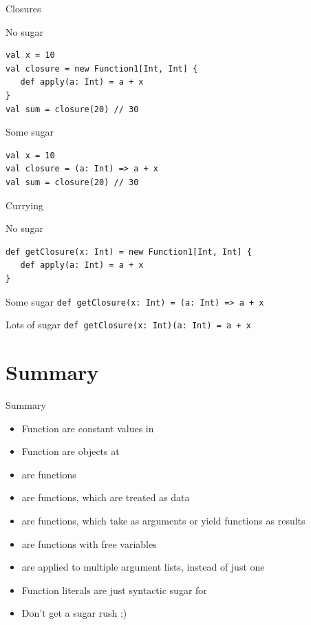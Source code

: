 \begin{frame}[fragile]{Closures}
\begin{exampleblock}{No sugar}
\begin{lstlisting}
val x = 10
val closure = new Function1[Int, Int] {
   def apply(a: Int) = a + x
}
val sum = closure(20) // 30
\end{lstlisting}
\end{exampleblock}
\begin{exampleblock}{Some sugar}
\begin{lstlisting}
val x = 10
val closure = (a: Int) => a + x
val sum = closure(20) // 30
\end{lstlisting}
\end{exampleblock}
\end{frame}

\begin{frame}[fragile]{Currying}
\begin{exampleblock}{No sugar}
\begin{lstlisting}
def getClosure(x: Int) = new Function1[Int, Int] {
   def apply(a: Int) = a + x
}
\end{lstlisting}
\end{exampleblock}
\begin{exampleblock}{Some sugar}
\lstinline!def getClosure(x: Int) = (a: Int) => a + x!
\end{exampleblock}
\begin{exampleblock}{Lots of sugar}
\lstinline!def getClosure(x: Int)(a: Int) = a + x!
\end{exampleblock}
\end{frame}

\section{Summary}
\begin{frame}{Summary}
\begin{itemize}
  \item Function  are constant values in 
  \item Function  are objects at 
  \item {} are  functions
  \item {} are functions, which are treated as
  data
  \item {} are functions, which take
   as arguments or yield functions as results
  \item {} are functions with free variables
  \item {} are applied to multiple argument lists,
  instead of just one
  \item Function literals are just syntactic sugar for 
  \item Don't get a sugar rush ;)
\end{itemize}
\end{frame}
